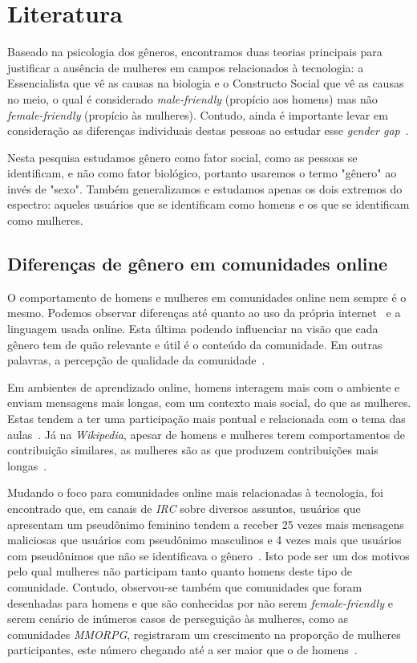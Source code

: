 \chapter{Literatura}
\label{ch:literatura}

Baseado na psicologia dos gêneros, encontramos duas teorias principais para justificar a ausência de mulheres em campos relacionados à tecnologia: a Essencialista que vê as causas na biologia e o Constructo Social que vê as causas no meio, o qual é considerado \emph{male-friendly} (propício aos homens) mas não \emph{female-friendly} (propício às mulheres). Contudo, ainda é importante levar em consideração as diferenças individuais destas pessoas ao estudar esse \emph{gender gap}~\cite{trauth2004understanding}.

Nesta pesquisa estudamos gênero como fator social, como as pessoas se identificam, e não como fator biológico, portanto usaremos o termo "gênero" ao invés de "sexo". Também generalizamos e estudamos apenas os dois extremos do espectro: aqueles usuários que se identificam como homens e os que se identificam como mulheres. 

\section{Diferenças de gênero em comunidades online}

O comportamento de homens e mulheres em comunidades online nem sempre é o mesmo. Podemos observar diferenças até quanto ao uso da própria internet~\cite{hargittai2006differences} e a linguagem usada online. Esta última podendo influenciar na visão que cada gênero tem  de quão relevante e útil é o conteúdo da comunidade. Em outras palavras, a percepção de qualidade da comunidade~\cite{Gefen:2005:YSS:1066149.1066156}.

Em ambientes de aprendizado online, homens interagem mais com o ambiente e enviam mensagens mais longas, com um contexto mais social, do que as mulheres. Estas tendem a ter uma participação mais pontual e relacionada com o tema das aulas~\cite{barrett1999gender}. Já na \emph{Wikipedia}, apesar de homens e mulheres terem comportamentos de contribuição similares, as mulheres são as que produzem contribuições mais longas~\cite{glott2010wikipedia}.

Mudando o foco para comunidades online mais relacionadas à tecnologia, foi encontrado que, em canais de \emph{IRC} sobre diversos assuntos, usuários que apresentam um pseudônimo feminino tendem a receber 25 vezes mais mensagens maliciosas que usuários com pseudônimo masculinos e 4 vezes mais que usuários com pseudônimos que não se identificava o gênero~\cite{meyer2006assessing}. Isto pode ser um dos motivos pelo qual mulheres não participam tanto quanto homens deste tipo de comunidade. Contudo, observou-se também que comunidades que foram desenhadas para homens e que são conhecidas por não serem \textit{female-friendly} e serem cenário de inúmeros casos de perseguição às mulheres, como as comunidades \emph{MMORPG}, registraram um crescimento na proporção de mulheres participantes, este número chegando até a ser maior que o de homens~\cite{taylor2003multiple}. 

